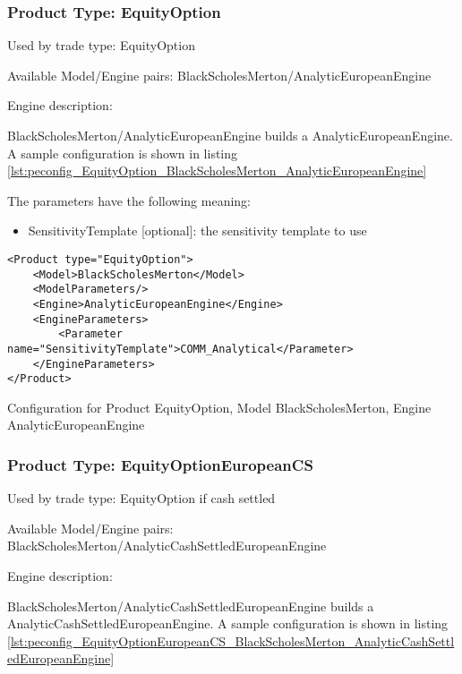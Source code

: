 \subsubsection{Product Type: EquityOption}

Used by trade type: EquityOption

Available Model/Engine pairs: BlackScholesMerton/AnalyticEuropeanEngine

Engine description:

BlackScholesMerton/AnalyticEuropeanEngine builds a AnalyticEuropeanEngine. A sample configuration is shown in listing
\ref{lst:peconfig_EquityOption_BlackScholesMerton_AnalyticEuropeanEngine}

The parameters have the following meaning:

\begin{itemize}
\item SensitivityTemplate [optional]: the sensitivity template to use 
\end{itemize}

\begin{longlisting}
\begin{verbatim}
<Product type="EquityOption">
    <Model>BlackScholesMerton</Model>
    <ModelParameters/>
    <Engine>AnalyticEuropeanEngine</Engine>
    <EngineParameters>
        <Parameter name="SensitivityTemplate">COMM_Analytical</Parameter>
    </EngineParameters>
</Product>
\end{verbatim}
\caption{Configuration for Product EquityOption, Model BlackScholesMerton, Engine AnalyticEuropeanEngine}
\label{lst:peconfig_EquityOption_BlackScholesMerton_AnalyticEuropeanEngine}
\end{longlisting}

\subsubsection{Product Type: EquityOptionEuropeanCS}

Used by trade type: EquityOption if cash settled

Available Model/Engine pairs: BlackScholesMerton/AnalyticCashSettledEuropeanEngine

Engine description:

BlackScholesMerton/AnalyticCashSettledEuropeanEngine builds a AnalyticCashSettledEuropeanEngine. A sample configuration is shown in listing
\ref{lst:peconfig_EquityOptionEuropeanCS_BlackScholesMerton_AnalyticCashSettledEuropeanEngine}

